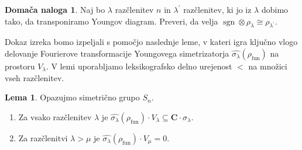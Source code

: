 \documentclass[11pt]{book}
\def\CC{\mathbf{C}}
\def\youngsym{\sigma_{\lambda}}
\DeclareMathOperator\sgn{sgn}
\DeclareMathOperator\fun{fun}
\theoremstyle{definition}
\theoremstyle{zgled}
\theoremstyle{zgledbrezstevilke}
\theoremstyle{odprtproblem}
\theoremstyle{domacanaloga}
\newtheorem{domacanaloga}[theorem]{Domača naloga}
\theoremstyle{izrek}
\newtheorem{lema}[theorem]{Lema}
\begin{document}
\begin{domacanaloga}
    Naj bo $\lambda$ razčlenitev $n$ in $\lambda^\prime$ razčlenitev, ki jo iz $\lambda$ dobimo tako, da transponiramo Youngov diagram. Preveri, da velja $\sgn \otimes \rho_{\lambda} \cong \rho_{\lambda^\prime}$.
\end{domacanaloga}        

Dokaz izreka bomo izpeljali s pomočjo naslednje leme, v kateri igra ključno vlogo delovanje Fourierove transformacije Youngovega simetrizatorja $\widehat{\youngsym}(\rho_{\fun})$ na prostoru $V_{\lambda}$. V lemi uporabljamo leksikografsko delno urejenost $<$ na množici vseh razčlenitev. 

\begin{lema}
Opazujmo simetrično grupo $S_n$.
\begin{enumerate}
    \item Za vsako razčlenitev $\lambda$ je $\widehat{\youngsym}(\rho_{\fun}) \cdot V_{\lambda} \subseteq \CC \cdot \youngsym$.
    \item Za razčlenitvi $\lambda > \mu$ je $\widehat{\youngsym}(\rho_{\fun}) \cdot V_{\mu} = 0$.
\end{enumerate}
\end{lema}
\end{document}
